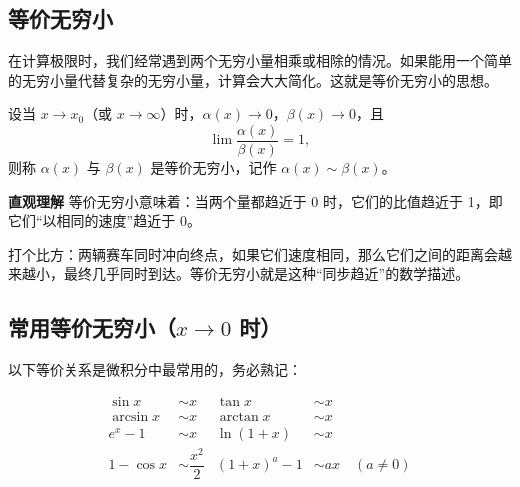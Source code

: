 \documentclass[fontset=fandol]{ctexart}
\newenvironment{custom}[1]{\par\noindent\textbf{#1}\quad}{\par\vspace{0.8em}}
\begin{document}
\subsection{等价无穷小}

在计算极限时，我们经常遇到两个无穷小量相乘或相除的情况。如果能用一个简单的无穷小量代替复杂的无穷小量，计算会大大简化。这就是等价无穷小的思想。

\begin{definition}[等价无穷小]
设当 \(x \to x_0\)（或 \(x \to \infty\)）时，\(\alpha(x) \to 0\)，\(\beta(x) \to 0\)，且
\[
\lim \dfrac{\alpha(x)}{\beta(x)} = 1,
\]
则称 \(\alpha(x)\) 与 \(\beta(x)\) 是等价无穷小，记作 \(\alpha(x) \sim \beta(x)\)。
\end{definition}

\begin{custom}{直观理解}
等价无穷小意味着：当两个量都趋近于 0 时，它们的比值趋近于 1，即它们“以相同的速度”趋近于 0。

打个比方：两辆赛车同时冲向终点，如果它们速度相同，那么它们之间的距离会越来越小，最终几乎同时到达。等价无穷小就是这种“同步趋近”的数学描述。
\end{custom}

\subsection{常用等价无穷小（\(x \to 0\) 时）}

以下等价关系是微积分中最常用的，务必熟记：

\[
\boxed{
\begin{aligned}
\sin x &\sim x & \tan x &\sim x \\
\arcsin x &\sim x & \arctan x &\sim x \\
e^x - 1 &\sim x & \ln(1+x) &\sim x \\
1 - \cos x &\sim \dfrac{x^2}{2} & (1+x)^a - 1 &\sim ax \quad (a \neq 0)
\end{aligned}
}
\]
\end{document}
